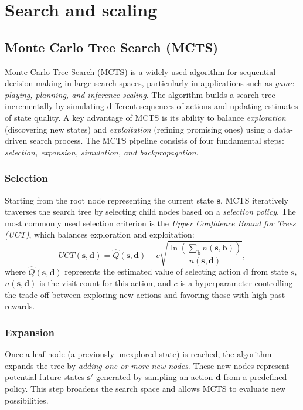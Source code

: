 \newpage
\section{Search and scaling}
\label{sec:search_extended}

\subsection{Monte Carlo Tree Search (MCTS)}
\label{sec:mcts}

Monte Carlo Tree Search (MCTS) is a widely used algorithm for sequential decision-making in large search spaces, particularly in applications such as \emph{game playing, planning, and inference scaling}. The algorithm builds a search tree incrementally by simulating different sequences of actions and updating estimates of state quality. A key advantage of MCTS is its ability to balance \emph{exploration} (discovering new states) and \emph{exploitation} (refining promising ones) using a data-driven search process. The MCTS pipeline consists of four fundamental steps: \emph{selection, expansion, simulation, and backpropagation}.

\subsubsection{Selection}
Starting from the root node representing the current state $\boldsymbol{s}$, MCTS iteratively traverses the search tree by selecting child nodes based on a \emph{selection policy}. The most commonly used selection criterion is the \emph{Upper Confidence Bound for Trees (UCT)}, which balances exploration and exploitation:
\begin{equation}
    \label{eq:UCT_mcts}
    UCT(\boldsymbol{s}, \boldsymbol{d}) = \hat{Q}(\boldsymbol{s}, \boldsymbol{d}) + c \sqrt{\frac{\ln \left(\sum_{\boldsymbol{b}} n(\boldsymbol{s}, \boldsymbol{b})\right)}{n(\boldsymbol{s}, \boldsymbol{d})}},
\end{equation}
where $\hat{Q}(\boldsymbol{s}, \boldsymbol{d})$ represents the estimated value of selecting action $\boldsymbol{d}$ from state $\boldsymbol{s}$, $n(\boldsymbol{s}, \boldsymbol{d})$ is the visit count for this action, and $c$ is a hyperparameter controlling the trade-off between exploring new actions and favoring those with high past rewards.

\subsubsection{Expansion}
Once a leaf node (a previously unexplored state) is reached, the algorithm expands the tree by \emph{adding one or more new nodes}. These new nodes represent potential future states $\boldsymbol{s}'$ generated by sampling an action $\boldsymbol{d}$ from a predefined policy. This step broadens the search space and allows MCTS to evaluate new possibilities.

